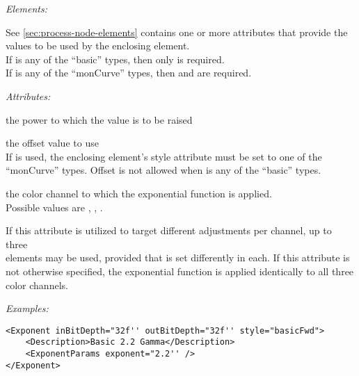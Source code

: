 \emph{Elements:}
\begin{xmlfields}
	\xmlitem[Description][optional] See \autoref{sec:process-node-elements}
	\xmlitem[ExponentParams][required] contains one or more attributes that provide the values to be used by the enclosing  element. \\
	If  is any of the ``basic'' types, then only  is required. \\
	If  is any of the ``monCurve'' types, then  and  are required. \par
	
		\emph{Attributes:}
		\begin{xmlfields}
		    \xmlitem["exponent"][required] the power to which the value is to be raised \\

		    
		    \xmlitem["offset"][optional] the offset value to use \\
		    If  is used, the enclosing  element's style attribute must be set to one of the ``monCurve'' types. Offset is not allowed when  is any of the ``basic'' types.\\
		    
		    
		    \xmlitem["channel"][optional] the color channel to which the exponential function is applied. \\
		    Possible values are , , .
		    
		    If this attribute is utilized to target different adjustments per channel, up to three \\  elements may be used, provided that  is set differently in each. If this attribute is not otherwise specified, the exponential function is applied identically to all three color channels.
		\end{xmlfields}
\end{xmlfields}



\emph{Examples:}
\begin{lstlisting}[caption=Using \xml{Exponent} node for applying a 2.2 gamma.]
<Exponent inBitDepth="32f'' outBitDepth="32f'' style="basicFwd">
	<Description>Basic 2.2 Gamma</Description>
	<ExponentParams exponent="2.2'' />
</Exponent>
\end{lstlisting}

